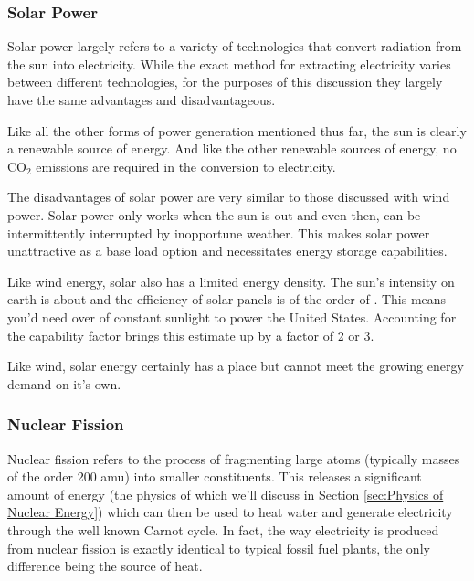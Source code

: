 	
	\subsubsection{Solar Power}
	
		Solar power largely refers to a variety of technologies that convert radiation from the sun into electricity. \cite{bibid} While the exact method for extracting electricity varies between different technologies, for the purposes of this discussion they largely have the same advantages and disadvantageous.
		
		 \begin{figure}[h!]
		 	\centering
		 	\caption{}
		 \end{figure}
	 
	 	Like all the other forms of power generation mentioned thus far, the sun is clearly a renewable source of energy. And like the other renewable sources of energy, no CO$_2$ emissions are required in the conversion to electricity. 
	 	
	 	The disadvantages of solar power are very similar to those discussed with wind power. Solar power only works when the sun is out and even then, can be intermittently interrupted by inopportune weather. \cite{bibid} This makes solar power unattractive as a base load option and necessitates energy storage capabilities. 
	 	
	 	Like wind energy, solar also has a limited energy density. The sun's intensity on earth is about  and the efficiency of solar panels is of the order of . \cite{bibid} This means you'd need over  of constant sunlight to power the United States. Accounting for the capability factor brings this estimate up by a factor of 2 or 3. 
	
		Like wind, solar energy certainly has a place but cannot meet the growing energy demand on it's own.
	
	\subsubsection{Nuclear Fission}
	
		Nuclear fission refers to the process of fragmenting large atoms (typically masses of the order 200 amu) into smaller constituents. \cite{bibid} This releases a significant amount of energy (the physics of which we'll discuss in Section \ref{sec:Physics of Nuclear Energy}) which can then be used to heat water and generate electricity through the well known Carnot cycle. \cite{bibid} In fact, the way electricity is produced from nuclear fission is exactly identical to typical fossil fuel plants, the only difference being the source of heat.
		

